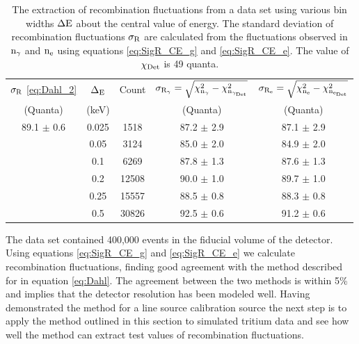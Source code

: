 \renewcommand{\baselinestretch}{2}
\small\normalsize
\begin{table}[h!]
\begin{center}
\footnotesize
\tabcolsep=0.11cm
\begin{tabular}{|c||c|c|c|c|}
\hline
$\rm \sigma_R$ \ref{eq:Dahl_2} & $\rm \Delta_E$ & Count & $\rm \sigma_{R_\gamma}=\sqrt{\chi_{n_{\gamma}}^2-\chi_{n_{\gamma_{Det}}}^2}$ & $\rm \sigma_{R_e}= \sqrt{\chi_{n_{e}}^2-\chi_{n_{e_{Det}}}^2}$ \\ 
(Quanta) & (keV) & & (Quanta) & (Quanta) \\ \hline
89.1 $\pm$ 0.6		& 0.025		& 1518 		& 87.2 $\pm$ 2.9	 	&	87.1 $\pm$ 2.9	 \\ \hline
					& 0.05 		& 3124 		& 85.0 $\pm$ 2.0	 	&	84.9 $\pm$ 2.0	 \\ \hline
					& 0.1 		& 6269  	& 87.8 $\pm$ 1.3		& 	87.6 $\pm$ 1.3		 \\ \hline
					& 0.2 		&12508  	& 90.0 $\pm$ 1.0  		& 	89.7 $\pm$ 1.0	 \\ \hline
					& 0.25 		&15557 	& 88.5 $\pm$ 0.8		&	88.3 $\pm$ 0.8 	 \\ \hline
					& 0.5		& 30826 	& 92.5  $\pm$ 0.6		&	91.2 $\pm$ 0.6		\\ \hline
\end{tabular}
\renewcommand{\baselinestretch}{1}
\small\normalsize
\caption{The extraction of recombination fluctuations from a \KrCal data set using various bin widths $\rm \Delta E$ about the central value of energy. The standard deviation of recombination fluctuations $\rm \sigma_R$ are calculated from the fluctuations observed in $\rm n_\gamma$ and $\rm n_e$ using equations \ref{eq:SigR_CE_g} and \ref{eq:SigR_CE_e}. The value of $\rm \chi_{Det}$ is 49 quanta. }%
\label{table:R_Kr}
\end{center}
\end{table}
\renewcommand{\baselinestretch}{2}
\small\normalsize


The \KrCal data set contained 400,000 events in the fiducial volume of the detector. Using equations \ref{eq:SigR_CE_g} and \ref{eq:SigR_CE_e} we calculate recombination fluctuations, finding good agreement with the method described for in equation \ref{eq:Dahl}. The agreement between the two methods is within 5\% and implies that the detector resolution has been modeled well. Having demonstrated the method for a line source calibration source the next step is to apply the method outlined in this section to simulated tritium data and see how well the method can extract test values of recombination fluctuations.


